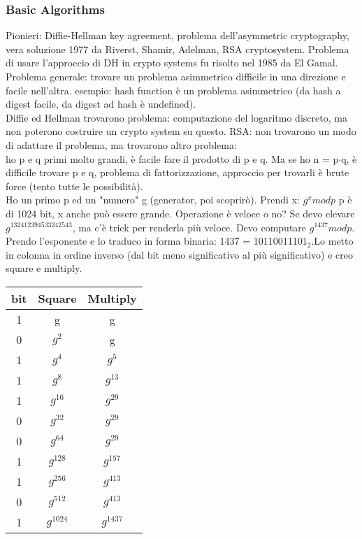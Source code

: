 \documentclass[16px]{article}
\begin{document}
\subsubsection{Basic Algorithms}
Pionieri: Diffie-Hellman key agreement, problema dell'asymmetric cryptography, vera soluzione 1977 da Riverst, Shamir, Adelman, RSA cryptosystem. Problema di usare l'approccio di DH in crypto systems fu risolto nel 1985 da El Gamal.\\ Problema generale: trovare un problema asimmetrico difficile in una direzione e facile nell'altra. esempio: hash function è un problema asimmetrico (da hash a digest facile, da digest ad hash è undefined).\\ Diffie ed Hellman trovarono problema: computazione del logaritmo discreto, ma non poterono costruire un crypto system su questo. RSA: non trovarono un modo di adattare il problema, ma trovarono altro problema:\\ ho p e q primi molto grandi, è facile fare il prodotto di p e q. Ma se ho n  = p$\cdot$q, è difficile trovare p e q, problema di fattorizzazione, approccio per trovarli è brute force (tento tutte le possibilità).\\ Ho un primo p ed un "numero" g (generator, poi scoprirò). Prendi x: $g^{x}modp$ p è di 1024 bit, x anche può essere grande. Operazione è veloce o no? Se devo elevare $g^{132412394533242543}$, ma c'è trick per renderla più veloce. Devo computare $g^{1437}modp$. Prendo l'esponente e lo traduco in forma binaria: 1437 = 10110011101$_{2}$.Lo metto in colonna in ordine inverso (dal bit meno significativo al più significativo) e creo square e multiply.
\begin{table}
\begin{tabular}{||c c c||}
\hline\hline
bit & Square & Multiply\\
\hline
1 & g & g \\
\hline
0 & $g^2$ & g \\
\hline
1 & $g^4$ & $g^5$ \\
\hline
1 & $g^8$ & $g^13$ \\
\hline
1 & $g^16$ & $g^29$ \\
\hline
0 & $g^32$ & $g^29$ \\
\hline
0 & $g^64$ & $g^29$ \\
\hline
1 & $g^128$ & $g^157$ \\
\hline
1 & $g^256$ & $g^413$ \\
\hline
0 & $g^512$ & $g^413$ \\
\hline
1 & $g^1024$ & $g^1437$ \\
\end{tabular}
\end{table}
\end{document}
